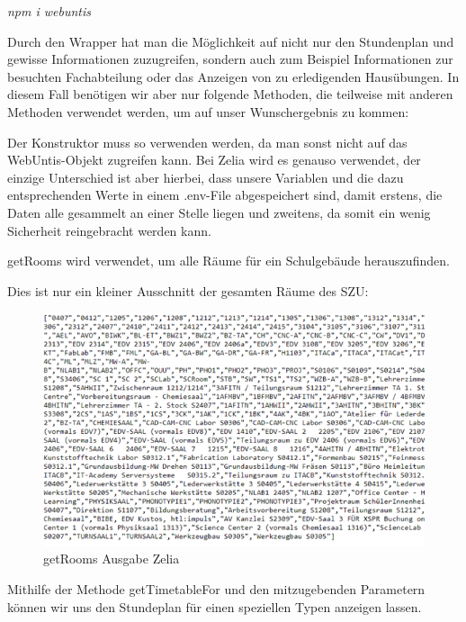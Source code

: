 \emph{npm i webuntis}

Durch den Wrapper hat man die Möglichkeit auf nicht nur den Stundenplan und gewisse Informationen zuzugreifen, sondern auch zum Beispiel Informationen zur besuchten Fachabteilung oder das Anzeigen von zu erledigenden Hausübungen. In diesem Fall benötigen wir aber nur folgende Methoden, die teilweise mit anderen Methoden verwendet werden, um auf unser Wunschergebnis zu kommen:



Der Konstruktor muss so verwenden werden, da man sonst nicht auf das WebUntis-Objekt zugreifen kann. Bei Zelia wird es genauso verwendet, der einzige Unterschied ist aber hierbei, dass unsere Variablen und die dazu entsprechenden Werte in einem .env-File abgespeichert sind, damit erstens, die Daten alle gesammelt an einer Stelle liegen und zweitens, da somit ein wenig Sicherheit reingebracht werden kann.


getRooms wird verwendet, um alle Räume für ein Schulgebäude herauszufinden.


Dies ist nur ein kleiner Ausschnitt der gesamten Räume des SZU:

\begin{figure}[H]
    \centering
    \includegraphics{media/WebUntis/getRoomsAusgabe.png}
    \caption{getRooms Ausgabe Zelia}
\end{figure}

Mithilfe der Methode getTimetableFor und den mitzugebenden Parametern können wir uns den Stundeplan für einen speziellen Typen anzeigen lassen.

